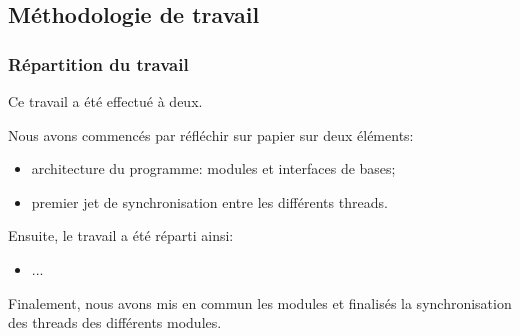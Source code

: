 \documentclass[11pt, a4paper]{article}
\begin{document}
\newpage

\subsection{Méthodologie de travail}
\subsubsection{Répartition du travail}

Ce travail a été effectué à deux.

Nous avons commencés par réfléchir sur papier sur deux éléments:

\begin{itemize}
    \item architecture du programme: modules et interfaces de bases;
    \item premier jet de synchronisation entre les différents threads. \\
\end{itemize}

Ensuite, le travail a été réparti ainsi:
\begin{itemize}
    \item ... \\
\end{itemize}

Finalement, nous avons mis en commun les modules et finalisés la synchronisation des threads des différents modules.

\newpage
\end{document}
